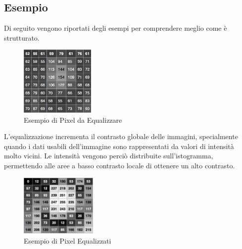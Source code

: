 \documentclass{article}
\begin{document}
\subsection{Esempio} 
Di seguito vengono riportati degli esempi per comprendere meglio come è strutturato.
\begin{figure}[h]
\centering
\includegraphics[width=0.32\textwidth]{BeforeEq.png}
\caption{Esempio di Pixel da Equalizzare}
\end{figure}
L'equalizzazione incrementa il contrasto globale delle immagini, specialmente quando i dati usabili dell'immagine sono rappresentati da valori di intensità molto vicini. Le intensità vengono perciò distribuite sull'istogramma, permettendo alle aree a basso contrasto locale di ottenere un alto contrasto.\newline
\begin{figure}[h]
\centering
\includegraphics[width=0.33\textwidth]{AfterEq.png}
\caption{Esempio di Pixel Equalizzati}
\end{figure}


\break
\end{document}
